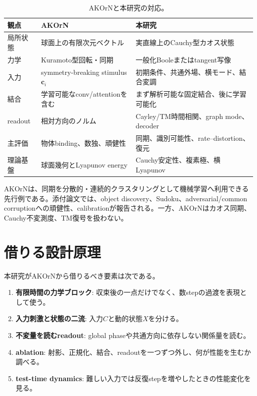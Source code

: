 \documentclass[a4paper,11pt,oneside,openany]{ltjsbook}
\newcommand{\vect}[1]{\bm{#1}}
\begin{document}
\begin{table}[htbp]
\centering
\caption{AKOrNと本研究の対応。}
\label{tab:akorn_comparison}
\begin{tabularx}{\textwidth}{p{31mm}p{53mm}X}
\toprule
観点 & AKOrN & 本研究 \\
\midrule
局所状態 & 球面上の有限次元ベクトル & 実直線上のCauchy型カオス状態 \\
力学 & Kuramoto型回転・同期 & 一般化Booleまたはtangent写像 \\
入力 & symmetry-breaking stimulus \(\vect c_i\) & 初期条件、共通外場、横モード、結合変調 \\
結合 & 学習可能なconv/attentionを含む & まず解析可能な固定結合、後に学習可能化 \\
readout & 相対方向のノルム & Cayley/TM時間相関、graph mode、decoder \\
主評価 & 物体binding、数独、頑健性 & 同期、識別可能性、rate--distortion、復元 \\
理論基盤 & 球面幾何とLyapunov energy & Cauchy安定性、複素極、横Lyapunov \\
\bottomrule
\end{tabularx}
\end{table}

AKOrNは、同期を分散的・連続的クラスタリングとして機械学習へ利用できる先行例である。添付論文では、object discovery、Sudoku、adversarial/common corruptionへの頑健性、calibrationが報告される\cite{akorn}。一方、AKOrNはカオス同期、Cauchy不変測度、TM復号を扱わない。

\section{借りる設計原理}

本研究がAKOrNから借りるべき要素は次である。

\begin{enumerate}
  \item \textbf{有限時間の力学ブロック}: 収束後の一点だけでなく、数stepの過渡を表現として使う。
  \item \textbf{入力刺激と状態の二流}: 入力\(C\)と動的状態\(X\)を分ける。
  \item \textbf{不変量を読むreadout}: global phaseや共通方向に依存しない関係量を読む。
  \item \textbf{ablation}: 射影、正規化、結合、readoutを一つずつ外し、何が性能を生むか調べる。
  \item \textbf{test-time dynamics}: 難しい入力では反復stepを増やしたときの性能変化を見る。
\end{enumerate}
\end{document}

